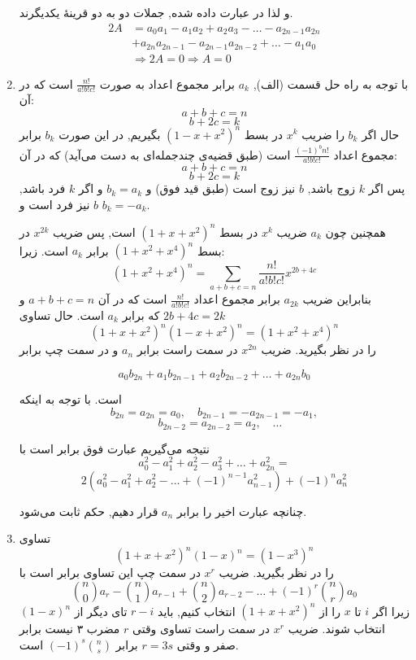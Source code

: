 \begin{enumerate}
    	و لذا در عبارت داده شده, جملات دو به دو قرینهٔ یکدیگرند.
    	\begin{align*}
    		2A &= a_0a_1 - a_1a_2 + a_2a_3 - \dots - a_{2n-1}a_{2n}\\
    		&+ a_{2n}a_{2n-1} - a_{2n-1}a_{2n-2} +\dots - a_1a_0 \\
    		&\Rightarrow 2A = 0 \Rightarrow A = 0
    	\end{align*}
	
	\item
        \p
    	با توجه به راه حل قسمت (الف), $a_k$ برابر مجموع اعداد به صورت $\frac{n!}{a!b!c!}$ است که در آن:
    	$$a + b + c = n$$ 
    	$$b + 2c = k$$
    	 حال اگر $b_k$ را ضریب $x^k$ در بسط $(1 - x + x^2)^n$ بگیریم, در این صورت $b_k$ برابر مجموع اعداد $\frac{(-1)^bn!}{a!b!c!}$ است (طبق قضیه‌ی چندجمله‌ای  به دست می‌آید) که در آن:
    	 $$a + b + c =  n$$ 
    	 $$b + 2c = k$$
    	 پس اگر $k$ زوج باشد, $b$ نیز زوج است (طبق قید فوق) و $b_k = a_k$ و اگر $k$ فرد باشد, $b$ نیز فرد است و $b_k = -a_k$.
    	 
        \p
        همچنین چون $a_k$ ضریب $x^k$ در بسط $(1 + x + x^2)^n$ است, پس ضریب $x^{2k}$ در بسط $(1 + x^2 + x^4)^n$ برابر $a_k$ است. زیرا:
         $$(1+x^2+x^4)^n=\sum_{a+b+c=n} \frac{n!}{a!b!c!} x^{2b+4c}$$
         بنابراین ضریب $a_{2k}$ برابر مجموع اعداد $\frac{n!}{a!b!c!}$ است که در آن $a+b+c=n$ و $2b+4c=2k$ که برابر $a_k$ است. حال تساوی
        $$(1 + x + x^2)^n(1 - x + x^2)^n = (1 + x^2 + x^4)^n$$
        را در نظر بگیرید. ضریب $x^{2n}$ در سمت راست برابر $a_n$ و در سمت چپ برابر
        
        $$a_0b_{2n} + a_1b_{2n - 1} + a_2b_{2n - 2} + \dots + a_{2n}b_0$$
        
        است. با توجه به اینکه
        $$b_{2n} = a_{2n} = a_0,\quad b_{2n - 1} = -a_{2n - 1} = -a_1,$$
        $$\quad b_{2n - 2} = a_{2n - 2} = a_2,\quad \dots$$
    	
        نتیجه می‌گیریم عبارت فوق برابر است با
        $$a_0^2 - a_1^2 + a_2^2 - a_3^2 + \dots + a_{2n}^2 = $$
        $$2(a_0^2 - a_1^2 + a_2^2 - \dots + (-1)^{n - 1}a_{n - 1}^2) + (-1)^n a_n^2$$
    	
        چنانچه عبارت اخیر را برابر $a_n$ قرار دهیم, حکم ثابت می‌شود.
        
	\item
        \p
    	تساوی
    	$$(1 + x + x^2)^n(1 - x)^n = (1 - x^3)^n$$
        را در نظر بگیرید. ضریب $x^r$ در سمت چپ این تساوی برابر است با
    	$${n \choose 0}a_r - {n \choose 1}a_{r - 1} + {n \choose 2}a_{r - 2} - \dots + (-1)^r{n \choose r}a_0$$
        زیرا اگر $i$ تا $x$ را از $(1+x+x^2)^n$ انتخاب کنیم, باید $r-i$ تای دیگر از $(1-x)^n$ انتخاب شوند. ضریب $x^r$ در سمت راست تساوی وقتی $r$ مضرب ۳ نیست برابر صفر و وقتی $r = 3s$ برابر $(-1)^s{n \choose s}$ است.
	\end{enumerate}
